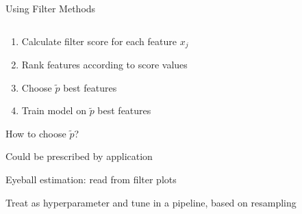 \documentclass[11pt,compress,t,notes=noshow, xcolor=table]{beamer}
\begin{document}
%  
\begin{vbframe}{Using Filter Methods}


\begin{columns}
\begin{column}{0.65\textwidth}
    \begin{enumerate}{}
    \setlength{\itemsep}{1.2em}
        \item Calculate filter score for each feature $x_j$
        \item Rank features according to score values
        \item Choose $\tilde{p}$ best features
        \item Train model on $\tilde{p}$ best features
    \end{enumerate}

    \begin{blocki}{How to choose $\tilde{p}$?}
        \item Could be prescribed by application
        \item Eyeball estimation: read from filter plots
        \item Treat as hyperparameter and tune in a pipeline, based on resampling
    \end{blocki}
\end{column}


\end{columns}
\end{vbframe}
\end{document}
